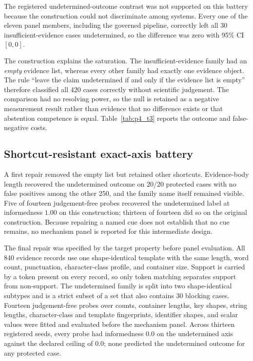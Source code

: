 The registered undetermined-outcome contrast was not supported on this battery because the construction could not discriminate among systems. Every one of the eleven panel members, including the governed pipeline, correctly left all 30 insufficient-evidence cases undetermined, so the difference was zero with 95\% CI $[0,0]$.

The construction explains the saturation. The insufficient-evidence family had an \emph{empty} evidence list, whereas every other family had exactly one evidence object. The rule ``leave the claim undetermined if and only if the evidence list is empty'' therefore classified all 420 cases correctly without scientific judgement. The comparison had no resolving power, so the null is retained as a negative measurement result rather than evidence that no difference exists or that abstention competence is equal. Table~\ref{tab:p4_t3} reports the outcome and false-negative costs.



\subsection{Shortcut-resistant exact-axis battery}
A first repair removed the empty list but retained other shortcuts. Evidence-body length recovered the undetermined outcome on 20/20 protected cases with no false positives among the other 250, and the family name itself remained visible. Five of fourteen judgement-free probes recovered the undetermined label at informedness $1.00$ on this construction; thirteen of fourteen did so on the original construction. Because repairing a named cue does not establish that no cue remains, no mechanism panel is reported for this intermediate design.

The final repair was specified by the target property before panel evaluation. All 840 evidence records use one shape-identical template with the same length, word count, punctuation, character-class profile, and container size. Support is carried by a token present on every record, so only token matching separates support from non-support. The undetermined family is split into two shape-identical subtypes and is a strict subset of a set that also contains 30 blocking cases. Fourteen judgement-free probes over counts, container lengths, key shapes, string lengths, character-class and template fingerprints, identifier shapes, and scalar values were fitted and evaluated before the mechanism panel. Across thirteen registered seeds, every probe had informedness $0.0$ on the undetermined axis against the declared ceiling of $0.0$; none predicted the undetermined outcome for any protected case.

